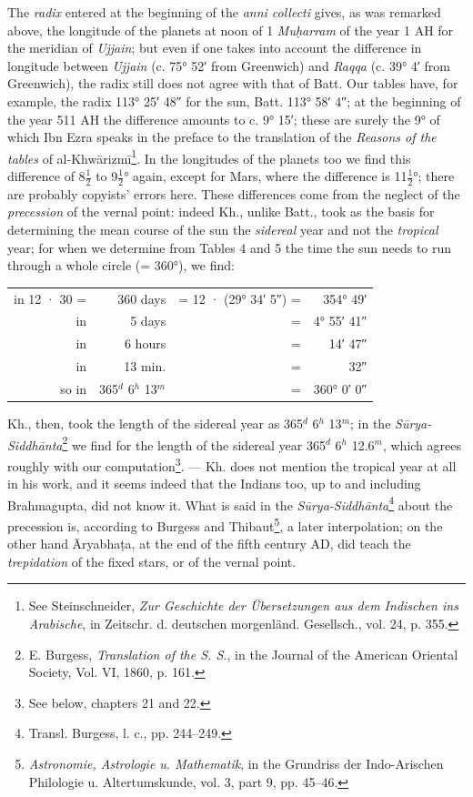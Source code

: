 \documentclass[11pt]{article}
\newcommand{\Pg}[1]{\marginpar{\footnotesize\color{gray}#1}}
\begin{document}
\par \Pg{42}The \emph{radix} entered at the beginning of the \emph{anni collecti} gives, as was remarked above, the longitude of the planets at noon of 1 \emph{Muḥarram} of the year 1 AH for the meridian of \emph{Ujjain}; but even if one takes into account the difference in longitude between \emph{Ujjain} (c. 75° 52′ from Greenwich) and \emph{Raqqa} (c. 39° 4′ from Greenwich), the radix still does not agree with that of Batt. Our tables have, for example, the radix 113° 25′ 48″ for the sun, Batt. 113° 58′ 4″; at the beginning of the year 511 AH the difference amounts to c. 9° 15′; these are surely the 9° of which Ibn Ezra speaks in the preface to the translation of the \emph{Reasons of the tables} of al-Khwārizmī\footnote{See Steinschneider, \emph{Zur Geschichte der Übersetzungen aus dem Indischen ins Arabische}, in Zeitschr. d. deutschen morgenländ. Gesellsch., vol. 24, p. 355.}. In the longitudes of the planets too we find this difference of 8$\tfrac{1}{2}$ to 9$\tfrac{1}{2}$° again, except for Mars, where the difference is 11$\tfrac{1}{2}$°; there are probably copyists' errors here. These differences come from the neglect of the \emph{precession} of the vernal point: indeed Kh., unlike Batt., took as the basis for determining the mean course of the sun the \emph{sidereal} year and not the \emph{tropical} year; for when we determine from Tables 4 and 5 the time the sun needs to run through a whole circle (= 360°), we find:\par
\begin{center}\small\begin{tabular}{rrrr}
in 12 · 30 = & 360 days & = 12 · (29° 34′ 5″) = & 354° 49′ \\
in & 5 days & = & 4° 55′ 41″ \\
in & 6 hours & = & 14′ 47″ \\
in & 13 min. & = & 32″ \\
so in & 365$^{d}$ 6$^{h}$ 13$^{m}$ & = & 360° 0′ 0″ \\
\end{tabular}\end{center}
\par Kh., then, took the length of the sidereal year as 365$^{d}$ 6$^{h}$ 13$^{m}$; in the \emph{Sūrya-Siddhānta}\footnote{E. Burgess, \emph{Translation of the S. S.}, in the Journal of the American Oriental Society, Vol. VI, 1860, p. 161.} we find for the length of the sidereal year 365$^{d}$ 6$^{h}$ 12.6$^{m}$, which agrees roughly with our computation\footnote{See below, chapters 21 and 22.}. — Kh. does not mention the tropical year at all in his work, and it seems indeed that the Indians too, up to and including Brahmagupta, did not know it. What is said in the \emph{Sūrya-Siddhānta}\footnote{Transl. Burgess, l. c., pp. 244–249.} about the precession is, according to Burgess and Thibaut\footnote{\emph{Astronomie, Astrologie u. Mathematik}, in the Grundriss der Indo-Arischen Philologie u. Altertumskunde, vol. 3, part 9, pp. 45–46.}, a later interpolation; on the other hand Āryabhaṭa, at the end of the fifth century AD, did teach the \emph{trepidation} of the fixed stars, or of the vernal point.\par
\end{document}
